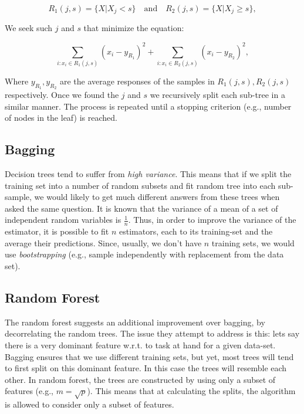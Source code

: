 \begin{equation}
  R_1(j,s) = \{ X\lvert X_j<s \}\quad\text{and}\quad R_2(j,s) = \{ X\lvert X_j \geq s \},
\end{equation}

We seek such $j$ and $s$ that minimize the equation:

\begin{equation}
  \sum\limits_{i:x_i\in R_1(j,s)}{(x_i-y_{R_1})}^2 + \sum\limits_{i:x_i\in R_2(j,s)}{(x_i-y_{R_2})}^2,
\end{equation}

Where $y_{R_1}, y_{R_2}$ are the average responses of the samples in
$R_1(j,s), R_2(j,s)$ respectively.  Once we found the $j$ and $s$ we
recursively split each sub-tree in a similar manner.  The process is
repeated until a stopping criterion (e.g., number of nodes in the
leaf) is reached.

\subsection{Bagging}
Decision trees tend to suffer from \textit{high variance}. This means
that if we split the training set into a number of random subsets and
fit random tree into each sub-sample, we would likely to get much
different answers from these trees when asked the same question.  It
is known that the variance of a mean of a set of independent random
variables is $\frac{1}{n}$.  Thus, in order to improve the variance of
the estimator, it is possible to fit $n$ estimators, each to its
training-set and the average their predictions.  Since, usually, we
don't have $n$ training sets, we would use \textit{bootstrapping}
(e.g., sample independently with replacement from the data set).

\subsection{Random Forest}
The random forest suggests an additional improvement over bagging, by
decorrelating the random trees.  The issue they attempt to address is
this: lets say there is a very dominant feature w.r.t. to task at hand
for a given data-set.  Bagging ensures that we use different training
sets, but yet, most trees will tend to first split on this dominant
feature.  In this case the trees will resemble each other.  In random
forest, the trees are constructed by using only a subset of features
(e.g., $m = \sqrt{p}$).  This means that at calculating the splits,
the algorithm is allowed to consider only a subset of features.

